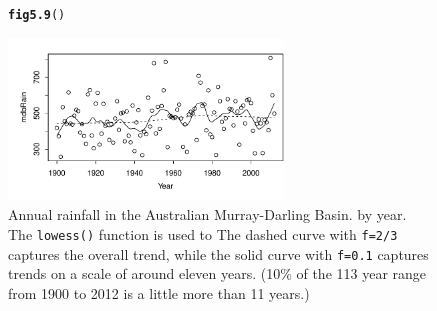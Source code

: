 \documentclass[12pt, a4paper,  BCOR=8.25mm, DIV=15]{scrartcl}\usepackage[]{graphicx}\usepackage[]{color}
\makeatletter
\newcommand{\hlstd}[1]{\textcolor[rgb]{0.345,0.345,0.345}{#1}}%
\newcommand{\hlkwd}[1]{\textcolor[rgb]{0.737,0.353,0.396}{\textbf{#1}}}%
\newenvironment{kframe}{%
 \def\at@end@of@kframe{}%
 \ifinner\ifhmode%
  \def\at@end@of@kframe{\end{minipage}}%
  \begin{minipage}{\columnwidth}%
 \fi\fi%
 \def\FrameCommand##1{\hskip\@totalleftmargin \hskip-\fboxsep
 \colorbox{shadecolor}{##1}\hskip-\fboxsep
     \hskip-\linewidth \hskip-\@totalleftmargin \hskip\columnwidth}%
 \MakeFramed {\advance\hsize-\width
   \@totalleftmargin\z@ \linewidth\hsize
   \@setminipage}}%
 {\par\unskip\endMakeFramed%
 \at@end@of@kframe}
\newenvironment{knitrout}{}{} %
\newcommand{\txtt}[1]{{\texttt{#1}}}
\makeatother
\begin{document}
\begin{figure}
\begin{knitrout}
\color{fgcolor}\begin{kframe}
\begin{alltt}
\hlkwd{fig5.9}\hlstd{()}
\end{alltt}
\end{kframe}

{\centering \includegraphics[width=0.65\textwidth]{figs/glm-fig5_9e-1} 

}



\end{knitrout}
\caption{Annual rainfall in the Australian Murray-Darling Basin.
by year.  The \txtt{lowess()} function is used to
The dashed curve with \txtt{f=2/3} captures the
overall trend, while the solid curve with \txtt{f=0.1}
captures trends on a scale of around eleven years. (10\% of the 113 year
range from 1900 to 2012 is a little more than 11 years.)\label{fig:mdbRain}}
\end{figure}
\end{document}
